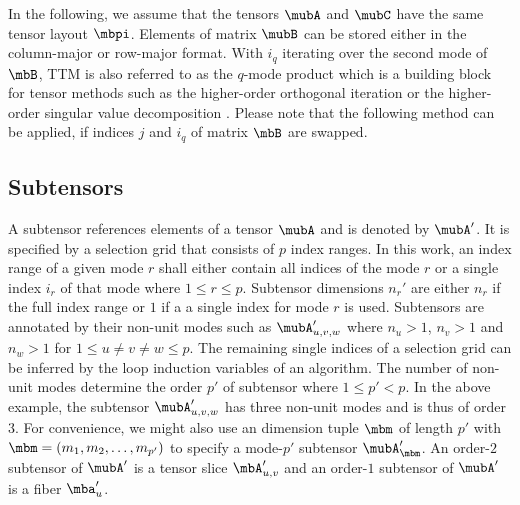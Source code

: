 In the following, we assume that the tensors $\mubA$ and $\mubC$ have the same tensor layout $\mbpi$. 
Elements of matrix $\mubB$ can be stored either in the column-major or row-major format.
With $i_q$ iterating over the second mode of $\mbB$, TTM is also referred to as the $q$-mode product which is a building block for tensor methods such as the higher-order orthogonal iteration or the higher-order singular value decomposition \cite{kolda:2009:decompositions}.
Please note that the following method can be applied, if indices $j$ and $i_q$ of matrix $\mbB$ are swapped.

\subsection{Subtensors}
A subtensor references elements of a tensor $\mubA$ and is denoted by $\mubA'$.
It is specified by a selection grid that consists of $p$ index ranges.
In this work, an index range of a given mode $r$ shall either contain all indices of the mode $r$ or a single index $i_r$ of that mode where $1 \leq r \leq p$. 
Subtensor dimensions $n_r'$ are either $n_r$ if the full index range or $1$ if a a single index for mode $r$ is used.
Subtensors are annotated by their non-unit modes such as $\mubA_{u,v,w}'$ where $n_u > 1$, $n_v > 1$ and $n_w >1$ for $1 \leq u \neq v \neq w \leq p$.
The remaining single indices of a selection grid can be inferred by the loop induction variables of an algorithm. 
The number of non-unit modes determine the order $p'$ of subtensor where $1 \leq p' < p$.
In the above example, the subtensor $\mubA_{u,v,w}'$ has three non-unit modes and is thus of order $3$.
For convenience, we might also use an dimension tuple $\mbm$ of length $p'$ with $\mbm = (m_1,m_2,\dots,m_{p'})$ to specify a mode-$p'$ subtensor $\mubA_{\mbm}'$.
An order-$2$ subtensor of $\mubA'$ is a tensor slice $\mbA_{u,v}'$ and an order-$1$ subtensor of $\mubA'$ is a fiber $\mba_u'$.

